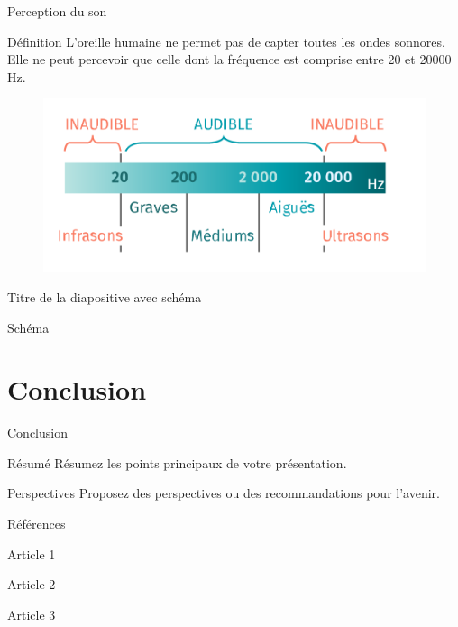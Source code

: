 \documentclass{beamer}
\begin{document}
\begin{frame}{Perception du son}
\begin{block}{Définition}
	L'oreille humaine ne permet pas de capter toutes les ondes sonnores. Elle ne peut percevoir que celle dont la fréquence est comprise entre 20 et 20000 Hz.
\end{block}
\begin{figure}
	\center
	\includegraphics[width=\textwidth]{domaine_audible.png}
\end{figure}
\end{frame}

\begin{frame}{Titre de la diapositive avec schéma}
	\begin{block}{Schéma}
	\end{block}
\end{frame}

\section{Conclusion}

\begin{frame}{Conclusion}
	\begin{block}{Résumé}
		Résumez les points principaux de votre présentation.
	\end{block}
	\begin{alertblock}{Perspectives}
		Proposez des perspectives ou des recommandations pour l'avenir.
	\end{alertblock}
\end{frame}

\begin{frame}{Références}
	\begin{thebibliography}{9}
		\item Article 1
		\item Article 2
		\item Article 3
	\end{thebibliography}
\end{frame}
\end{document}
